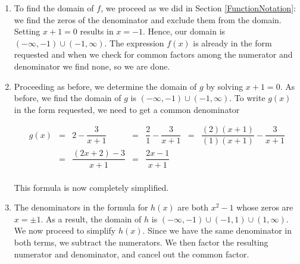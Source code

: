 {
\begin{enumerate}

\item To find the domain of $f$, we proceed as we did in Section \ref{FunctionNotation}: we find the zeros of the denominator and exclude them from the domain.  Setting $x+1=0$ results in  $x=-1$. Hence, our domain is  $(-\infty, -1) \cup (-1,\infty)$.  The expression $f(x)$ is already in the form requested and when we check for common factors among the numerator and denominator we find none, so we are done.

\item  Proceeding as before, we determine the domain of $g$ by solving $x+1=0$.  As before, we find the domain of $g$ is $(-\infty, -1) \cup (-1,\infty)$.  To write $g(x)$ in the form requested, we need to get a common denominator 

\[ \begin{array}{rclclcl}

g(x) & = & 2 - \dfrac{3}{x+1} & = & \dfrac{2}{1} - \dfrac{3}{x+1} & = & \dfrac{(2)(x+1)}{(1)(x+1)} - \dfrac{3}{x+1} \\ [.15in]
     & = & \dfrac{(2x+2) - 3}{x+1} & = & \dfrac{2x-1}{x+1} & & \\ \end{array} \]

This formula is now completely simplified.


\item  The denominators in the formula for $h(x)$ are both $x^2-1$ whose zeros are  $x = \pm 1$.  As a result, the domain of $h$ is $(-\infty, -1) \cup (-1,1) \cup (1, \infty)$.  We now proceed to simplify $h(x)$.  Since we have the same denominator in both terms, we subtract the numerators.  We then factor the resulting numerator and denominator, and cancel out the common factor.


\end{enumerate}}
